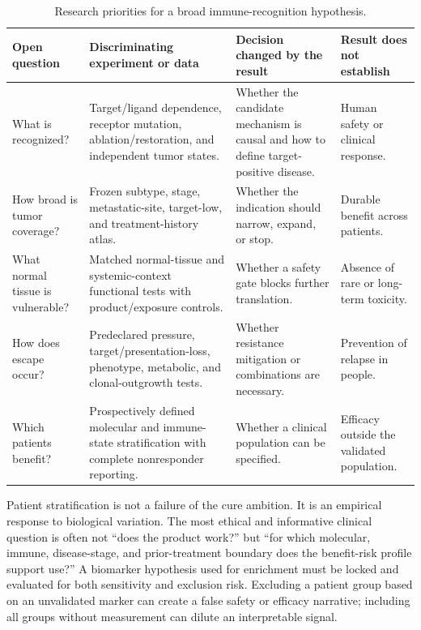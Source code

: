 \documentclass[10pt,conference]{IEEEtran}
\begin{document}
\begin{table}[!t]\caption{Research priorities for a broad immune-recognition hypothesis.}\label{tab:priorities}\centering\footnotesize
\begin{tabular}{@{}p{}p{}p{}p{}@{}}\toprule
Open question & Discriminating experiment or data & Decision changed by the result & Result does not establish\\\midrule
What is recognized? & Target/ligand dependence, receptor mutation, ablation/restoration, and independent tumor states. & Whether the candidate mechanism is causal and how to define target-positive disease. & Human safety or clinical response.\\
How broad is tumor coverage? & Frozen subtype, stage, metastatic-site, target-low, and treatment-history atlas. & Whether the indication should narrow, expand, or stop. & Durable benefit across patients.\\
What normal tissue is vulnerable? & Matched normal-tissue and systemic-context functional tests with product/exposure controls. & Whether a safety gate blocks further translation. & Absence of rare or long-term toxicity.\\
How does escape occur? & Predeclared pressure, target/presentation-loss, phenotype, metabolic, and clonal-outgrowth tests. & Whether resistance mitigation or combinations are necessary. & Prevention of relapse in people.\\
Which patients benefit? & Prospectively defined molecular and immune-state stratification with complete nonresponder reporting. & Whether a clinical population can be specified. & Efficacy outside the validated population.\\\bottomrule\end{tabular}\end{table}

Patient stratification is not a failure of the cure ambition. It is an empirical response to biological variation. The most ethical and informative clinical question is often not ``does the product work?'' but ``for which molecular, immune, disease-stage, and prior-treatment boundary does the benefit-risk profile support use?'' A biomarker hypothesis used for enrichment must be locked and evaluated for both sensitivity and exclusion risk. Excluding a patient group based on an unvalidated marker can create a false safety or efficacy narrative; including all groups without measurement can dilute an interpretable signal.
\end{document}
